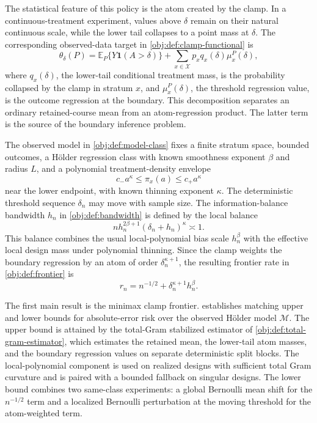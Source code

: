 \documentclass[11pt]{article}
\begin{document}
The statistical feature of this policy is the atom created by the clamp. In a continuous-treatment experiment, values above \(\delta\) remain on their natural continuous scale, while the lower tail collapses to a point mass at \(\delta\). The corresponding observed-data target in \cref{obj:def:clamp-functional} is
\[
\theta_\delta(P)
=
\mathbb E_P\{Y\mathbf 1(A>\delta)\}
+
\sum_{x\in\mathcal X}p_xq_x(\delta)\mu_x^P(\delta),
\]
where \(q_x(\delta)\), the lower-tail conditional treatment mass, is the probability collapsed by the clamp in stratum \(x\), and \(\mu_x^P(\delta)\), the threshold regression value, is the outcome regression at the boundary. This decomposition separates an ordinary retained-course mean from an atom-regression product. The latter term is the source of the boundary inference problem.

The observed model in \cref{obj:def:model-class} fixes a finite stratum space, bounded outcomes, a Hölder regression class with known smoothness exponent \(\beta\) and radius \(L\), and a polynomial treatment-density envelope
\[
c_-a^\kappa\leq \pi_x(a)\leq c_+a^\kappa
\]
near the lower endpoint, with known thinning exponent \(\kappa\). The deterministic threshold sequence \(\delta_n\) may move with sample size. The information-balance bandwidth \(h_n\) in \cref{obj:def:bandwidth} is defined by the local balance
\[
n h_n^{2\beta+1}(\delta_n+h_n)^\kappa\asymp1.
\]
This balance combines the usual local-polynomial bias scale \(h_n^\beta\) with the effective local design mass under polynomial thinning. Since the clamp weights the boundary regression by an atom of order \(\delta_n^{\kappa+1}\), the resulting frontier rate in \cref{obj:def:frontier} is
\[
r_n=n^{-1/2}+\delta_n^{\kappa+1}h_n^\beta.
\]

The first main result is the minimax clamp frontier.  establishes matching upper and lower bounds for absolute-error risk over the observed Hölder model \(\mathcal M\). The upper bound is attained by the total-Gram stabilized estimator of \cref{obj:def:total-gram-estimator}, which estimates the retained mean, the lower-tail atom masses, and the boundary regression values on separate deterministic split blocks. The local-polynomial component is used on realized designs with sufficient total Gram curvature and is paired with a bounded fallback on singular designs. The lower bound combines two same-class experiments: a global Bernoulli mean shift for the \(n^{-1/2}\) term and a localized Bernoulli perturbation at the moving threshold for the atom-weighted term.
\end{document}
